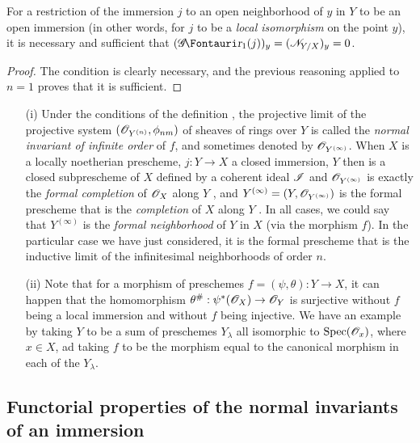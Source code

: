\begin{corollary}[16.1.10]
\label{IV.16.1.10}
For a restriction of the immersion $j$ to an open neighborhood of $y$ in $Y$ to be an open immersion (in other words, for $j$ to be a \emph{local isomorphism} on the point $y$), it is necessary and sufficient that $(\shGr_1(j))_y = (\sh{N}_{Y/X})_y = 0$.
\end{corollary}

\begin{proof}
The condition is clearly necessary, and the previous reasoning applied to $n=1$ proves that it is sufficient.
\end{proof}

\begin{remark}[16.1.11]
\label{IV.16.1.11}
\medskip\noindent
\begin{enumerate}
  \item[(i)] Under the conditions of the definition , the projective limit of the projective system $(\mathscr{O}_{Y^{(n)}}, \phi_{nm})$ of sheaves of rings over $Y$ is called the \emph{normal invariant of infinite order} of $f$, and sometimes denoted by $\mathscr{O}_{Y^{(\infty)}}$.
  When $X$ is a locally noetherian prescheme, $j:Y \to X$ a closed immersion, $Y$ then is a closed subprescheme of $X$ defined by a coherent ideal $\mathscr{I}$ and $\mathscr{O}_{Y^{(\infty)}}$ is exactly the \emph{formal completion} of $\mathscr{O}_X$ along $Y$ , and $Y^{(\infty)} = (Y, \mathscr{O}_{Y^{(\infty)}})$ is the formal prescheme that is the \emph{completion} of $X$ along $Y$ .
  In all cases, we could say that $Y^{(\infty)}$ is the \emph{formal neighborhood} of $Y$ in $X$ (via the morphism $f$).
  In the particular case we have just considered, it is the formal prescheme that is the inductive limit of the infinitesimal neighborhoods of order $n$.
  \item[(ii)] Note that for a morphism of preschemes $f=(\psi, \theta): Y \to X$, it can happen that the homomorphism $\theta^\#:\psi^*(\sh{O}_X) \to \sh{O}_Y$ is surjective without $f$ being a local 
  immersion and without $f$ being injective.
  We have an example by taking $Y$ to be a sum of preschemes $Y_\lambda$ all isomorphic to $\operatorname{Spec}(\mathscr{O}_x)$, where $x \in X$, ad taking $f$ to be the morphism equal to the canonical morphism in each of the $Y_\lambda$.
\end{enumerate}
\end{remark}

\subsection{Functorial properties of the normal invariants of an immersion}
\label{IV.16.2}

